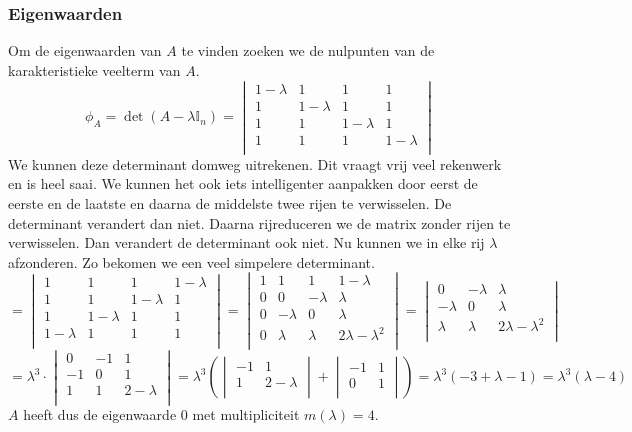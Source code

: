 \documentclass[lineaire_algebra_oplossingen.tex]{subfiles}
\begin{document}
\subsubsection*{Eigenwaarden}
Om de eigenwaarden van $A$ te vinden zoeken we de nulpunten van de karakteristieke veelterm van $A$.
\[
\phi_A = \det(A-\lambda\mathbb{I}_n) =
\begin{vmatrix}
1-\lambda & 1 & 1 & 1\\
1 & 1-\lambda & 1 & 1\\
1 & 1 & 1-\lambda & 1\\
1 & 1 & 1 & 1-\lambda\\
\end{vmatrix}
\]
We kunnen deze determinant domweg uitrekenen. Dit vraagt vrij veel rekenwerk en is heel saai. We kunnen het ook iets intelligenter aanpakken door eerst de eerste en de laatste en daarna de middelste twee rijen te verwisselen. De determinant verandert dan niet. Daarna rijreduceren we de matrix zonder rijen te verwisselen. Dan verandert de determinant ook niet. Nu kunnen we in elke rij $\lambda$ afzonderen. Zo bekomen we een veel simpelere determinant.
\[
=
\begin{vmatrix}
1 & 1 & 1 & 1-\lambda\\
1 & 1 & 1-\lambda & 1\\
1 & 1-\lambda & 1 & 1\\
1-\lambda & 1 & 1 & 1\\
\end{vmatrix}
=
\begin{vmatrix}
1 & 1 & 1 & 1-\lambda\\
0 & 0 & -\lambda & \lambda\\
0 & -\lambda & 0 & \lambda\\
0 & \lambda & \lambda & 2\lambda-\lambda^2\\
\end{vmatrix}
=
\begin{vmatrix}
0 & -\lambda & \lambda\\
-\lambda & 0 & \lambda\\
\lambda & \lambda & 2\lambda-\lambda^2\\
\end{vmatrix}
\]
\[
= \lambda^3\cdot
\begin{vmatrix}
0 & -1 & 1\\
-1 & 0 & 1\\
1 & 1 & 2-\lambda\\
\end{vmatrix}
=
\lambda^3
\left(
\begin{vmatrix}
-1 & 1\\
1 & 2-\lambda\\
\end{vmatrix}
+
\begin{vmatrix}
-1 & 1\\
0 & 1\\
\end{vmatrix}
\right)
=
\lambda^3
\left(
-3+\lambda-1
\right)
=
\lambda^3(\lambda-4)
\]
$A$ heeft dus de eigenwaarde $0$ met multipliciteit $m(\lambda) = 4$.
\end{document}
